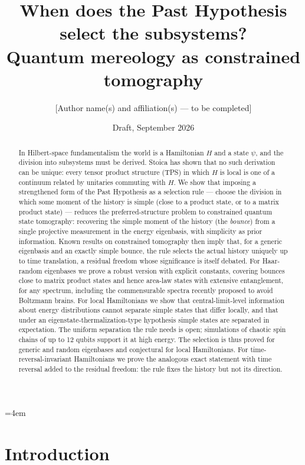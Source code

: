 \documentclass[11pt]{article}
\title{When does the Past Hypothesis select the subsystems?\\ Quantum mereology as constrained tomography}
\author{[Author name(s) and affiliation(s) --- to be completed]}
\date{Draft, September 2026}
\theoremstyle{definition}
\theoremstyle{remark}
\begin{document}
\emergencystretch=4em
\maketitle

\begin{abstract}
In Hilbert-space fundamentalism the world is a Hamiltonian $H$ and a state $\psi$, and the division into subsystems must be derived. Stoica has shown that no such derivation can be unique: every tensor product structure (TPS) in which $H$ is local is one of a continuum related by unitaries commuting with $H$. We show that imposing a strengthened form of the Past Hypothesis as a selection rule --- choose the division in which some moment of the history is simple (close to a product state, or to a matrix product state) --- reduces the preferred-structure problem to constrained quantum state tomography: recovering the simple moment of the history (the \emph{bounce}) from a single projective measurement in the energy eigenbasis, with simplicity as prior information. Known results on constrained tomography then imply that, for a generic eigenbasis and an exactly simple bounce, the rule selects the actual history uniquely up to time translation, a residual freedom whose significance is itself debated. For Haar-random eigenbases we prove a robust version with explicit constants, covering bounces close to matrix product states and hence area-law states with extensive entanglement, for any spectrum, including the commensurable spectra recently proposed to avoid Boltzmann brains. For local Hamiltonians we show that central-limit-level information about energy distributions cannot separate simple states that differ locally, and that under an eigenstate-thermalization-type hypothesis simple states are separated in expectation. The uniform separation the rule needs is open; simulations of chaotic spin chains of up to 12 qubits support it at high energy. The selection is thus proved for generic and random eigenbases and conjectural for local Hamiltonians. For time-reversal-invariant Hamiltonians we prove the analogous exact statement with time reversal added to the residual freedom: the rule fixes the history but not its direction.
\end{abstract}

\section{Introduction}
\label{sec:intro}
\end{document}
